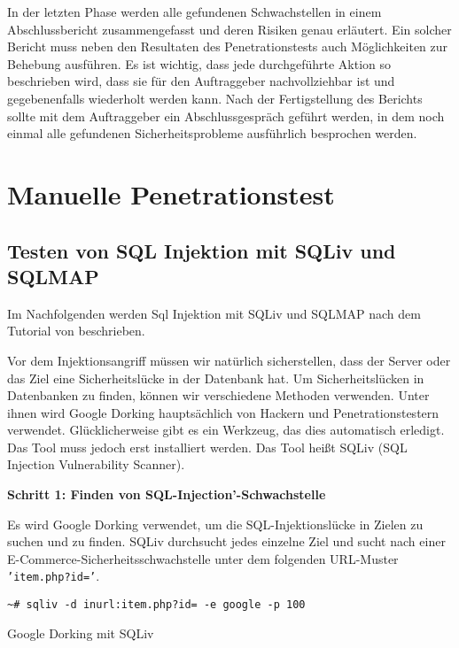 In der letzten Phase werden alle gefundenen Schwachstellen in einem Abschlussbericht zusammengefasst
und deren Risiken genau erläutert. Ein solcher Bericht muss neben den Resultaten des Penetrationstests auch
Möglichkeiten zur Behebung ausführen. Es ist wichtig, dass jede durchgeführte Aktion so beschrieben wird,
dass sie für den Auftraggeber nachvollziehbar ist und gegebenenfalls wiederholt werden kann. Nach der
Fertigstellung des Berichts sollte mit dem Auftraggeber ein Abschlussgespräch geführt werden, in dem noch
einmal alle gefundenen Sicherheitsprobleme ausführlich besprochen werden\cite[105-106]{pt03bsi}.

\section{Manuelle Penetrationstest}

\subsection{Testen von SQL Injektion mit SQLiv und SQLMAP}

Im Nachfolgenden werden Sql Injektion mit SQLiv und SQLMAP nach dem Tutorial von \cite{ramadhan17sqlinj} beschrieben.

Vor dem Injektionsangriff müssen wir natürlich sicherstellen, dass der Server oder das Ziel eine Sicherheitslücke in der Datenbank hat. Um Sicherheitslücken in Datenbanken zu finden, können wir verschiedene Methoden verwenden. Unter ihnen wird Google Dorking hauptsächlich von Hackern und Penetrationstestern verwendet. Glücklicherweise gibt es ein Werkzeug, das dies automatisch erledigt. Das Tool muss jedoch erst installiert werden. Das Tool heißt SQLiv (SQL Injection Vulnerability Scanner).

\textbf{Schritt 1: Finden von SQL-Injection'-Schwachstelle}

Es wird Google Dorking verwendet, um die SQL-Injektionslücke in Zielen zu suchen und zu finden. SQLiv durchsucht jedes einzelne Ziel und sucht nach einer E-Commerce-Sicherheitsschwachstelle unter dem folgenden URL-Muster \texttt{'item.php?id='}.

\begin{Listing}[h]
	\begin{lstlisting}
~# sqliv -d inurl:item.php?id= -e google -p 100
	\end{lstlisting}
	\caption{Google Dorking mit SQLiv}
	\label{lst:gdsqliv}
\end{Listing}

